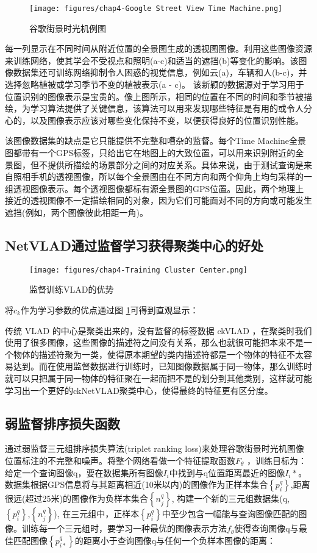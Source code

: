 \begin{figure}[H]
	\centering
	\texttt{[image: figures/chap4-Google Street View Time Machine.png]}
	\caption{谷歌街景时光机例图}
\end{figure}
 
每一列显示在不同时间从附近位置的全景图生成的透视图图像。利用这些图像资源来训练网络，使其学会不受视点和照明(a-c)和适当的遮挡(b)等变化的影响。该图像数据集还可训练网络抑制令人困惑的视觉信息，例如云(a)，车辆和人(b-c)，并选择忽略植被或学习季节不变的植被表示(a - c)。
该新颖的数据源对于学习用于位置识别的图像表示是宝贵的。像上图所示，相同的位置在不同的时间和季节被描绘，为学习算法提供了关键信息，该算法可以用来发现哪些特征是有用的或令人分心的，以及图像表示应该对哪些变化保持不变，以便获得良好的位置识别性能。

该图像数据集的缺点是它只能提供不完整和嘈杂的监督。每个Time Machine全景图都带有一个GPS标签，只给出它在地图上的大致位置，可以用来识别附近的全景图，但不提供所描绘的场景部分之间的对应关系。具体来说，由于测试查询是来自照相手机的透视图像，所以每个全景图由在不同方向和两个仰角上均匀采样的一组透视图像表示。每个透视图像都标有源全景图的GPS位置。因此，两个地理上接近的透视图像不一定描绘相同的对象，因为它们可能面对不同的方向或可能发生遮挡(例如，两个图像彼此相距一角)。

\subsection{NetVLAD通过监督学习获得聚类中心的好处}

\begin{figure}[htbp]
	\centering
	\texttt{[image: figures/chap4-Training Cluster Center.png]}
	\caption{监督训练VLAD的优势}
	\label{tra_adv}
\end{figure} 
将$c_k$作为学习参数的优点通过图 \ref{tra_adv}可得到直观显示：
  
传统 VLAD 的中心是聚类出来的，没有监督的标签数据 ckVLAD ，在聚类时我们使用了很多图像，这些图像的描述符之间没有关系，那么也就很可能把本来不是一个物体的描述符聚为一类，使得原本期望的类内描述符都是一个物体的特征不太容易达到。而在使用监督数据进行训练时，已知图像数据属于同一物体，那么训练时就可以只把属于同一物体的特征聚在一起而把不是的划分到其他类别，这样就可能学习出一个更好的ckNetVLAD聚类中心，使得最终的特征更有区分度。

\subsection{弱监督排序损失函数}
通过弱监督三元组排序损失算法(triplet ranking loss)来处理谷歌街景时光机图像位置标注的不完整和噪声。将整个网络看做一个特征提取函数$F_\theta$ ，训练目标为：给定一个查询图像q，要在数据集所有图像$I_i$中找到与q位置距离最近的图像$I_i*$。数据集根据GPS信息将与其距离相近(10米以内)的图像作为正样本集合$\left\{p_i^q\right\}$,距离很远(超过25米)的图像作为负样本集合$\left\{n_j^q\right\}$, 构建一个新的三元组数据集(q,$\left\{p_i^q\right\}$,$\left\{n_j^q\right\}$), 在三元组中，正样本$\left\{p_i^q\right\}$中至少包含一幅能与查询图像匹配的图像。训练每一个三元组时，要学习一种最优的图像表示方法$f_\theta$使得查询图像q与最佳匹配图像$\left\{p_{i*}^q\right\}$的距离小于查询图像q与任何一个负样本图像的距离：

